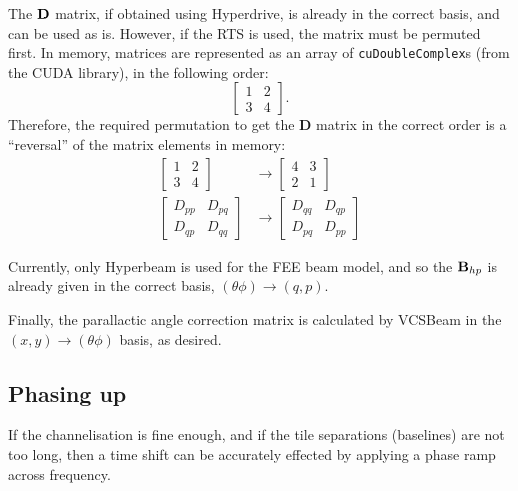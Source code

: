 \documentclass{book}
\newcommand{\vcsbeam}{{\sc VCSBeam}}
\begin{document}
The ${\bf D}$ matrix, if obtained using Hyperdrive, is already in the correct basis, and can be used as is.
However, if the RTS is used, the matrix must be permuted first.
In memory, matrices are represented as an array of \texttt{cuDoubleComplex}s (from the CUDA library), in the following order:
\begin{equation}
    \begin{bmatrix} 1 & 2 \\ 3 & 4 \end{bmatrix}.
\end{equation}
Therefore, the required permutation to get the {\bf D} matrix in the correct order is a ``reversal'' of the matrix elements in memory:
\begin{equation}
    \begin{aligned}
        \begin{bmatrix} 1 & 2 \\ 3 & 4 \end{bmatrix}
            &\rightarrow
            \begin{bmatrix} 4 & 3 \\ 2 & 1 \end{bmatrix} \\
        \begin{bmatrix} D_{pp} & D_{pq} \\ D_{qp} & D_{qq} \end{bmatrix}
            &\rightarrow
            \begin{bmatrix} D_{qq} & D_{qp} \\ D_{pq} & D_{pp} \end{bmatrix}
    \end{aligned}
\end{equation}

Currently, only Hyperbeam is used for the FEE beam model, and so the ${\bf B}_{hp}$ is already given in the correct basis, $(\theta\phi)\rightarrow(q,p)$.

Finally, the parallactic angle correction matrix is calculated by \vcsbeam{} in the $(x,y)\rightarrow(\theta\phi)$ basis, as desired.

\subsection{Phasing up}

If the channelisation is fine enough, and if the tile separations (baselines) are not too long, then a time shift can be accurately effected by applying a phase ramp across frequency.
\end{document}
